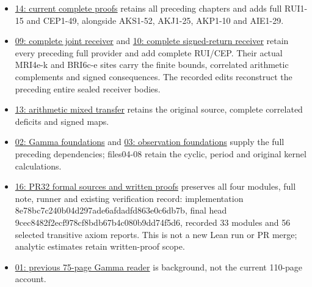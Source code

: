 \documentclass[
]{article}
\providecommand{\tightlist}{%
  \setlength{\itemsep}{0pt}\setlength{\parskip}{0pt}}
\begin{document}
\begin{itemize}
\tightlist
\item
  \href{https://github.com/KokunoYumeto/zeta-function-research-reader/blob/main/workbenches/splitzero-tandem/continuations/20260914-exterior-kernel-continuation/14_CURRENT_KERNEL_AND_MULTIPLICITY_PROOFS.tex}{14:
  current complete proofs} retains all preceding chapters and adds full
  RUI1-15 and CEP1-49, alongside AKS1-52, AKJ1-25, AKP1-10 and AIE1-29.
\item
  \href{https://github.com/KokunoYumeto/zeta-function-research-reader/blob/main/workbenches/splitzero-tandem/continuations/20260914-exterior-kernel-continuation/09_UPDATED_JOINT_NOTE.tex}{09:
  complete joint receiver} and
  \href{https://github.com/KokunoYumeto/zeta-function-research-reader/blob/main/workbenches/splitzero-tandem/continuations/20260914-exterior-kernel-continuation/10_UPDATED_SIGNED_RETURN.tex}{10:
  complete signed-return receiver} retain every preceding full provider
  and add complete RUI/CEP. Their actual MRI4e-k and BRI6c-e sites carry
  the finite bounds, correlated arithmetic complements and signed
  consequences. The recorded edits reconstruct the preceding entire
  sealed receiver bodies.
\item
  \href{https://github.com/KokunoYumeto/zeta-function-research-reader/blob/main/workbenches/splitzero-tandem/continuations/20260914-exterior-kernel-continuation/13_ARITHMETIC_MIXED_TRANSFER.tex}{13:
  arithmetic mixed transfer} retains the original source, complete
  correlated deficits and signed maps.
\item
  \href{https://github.com/KokunoYumeto/zeta-function-research-reader/blob/main/workbenches/splitzero-tandem/continuations/20260914-exterior-kernel-continuation/02_FULL_GAMMA_PROOFS.tex}{02:
  Gamma foundations} and
  \href{https://github.com/KokunoYumeto/zeta-function-research-reader/blob/main/workbenches/splitzero-tandem/continuations/20260914-exterior-kernel-continuation/03_FULL_OBSERVATION_PROOFS.tex}{03:
  observation foundations} supply the full preceding dependencies;
  files04-08 retain the cyclic, period and original kernel calculations.
\item
  \href{https://github.com/KokunoYumeto/zeta-function-research-reader/blob/main/workbenches/splitzero-tandem/continuations/20260914-exterior-kernel-continuation/16_PR32_FORMAL_SOURCE_AND_PROOFS.md}{16:
  PR32 formal sources and written proofs} preserves all four modules,
  full note, runner and existing verification record: implementation
  8e78bc7c240b04d297ade6afdadfd863e0c6db7b, final head
  9cec8482f2ecf978cf8bdb67b4c080b9dd74f5d6, recorded 33 modules and 56
  selected transitive axiom reports. This is not a new Lean run or PR
  merge; analytic estimates retain written-proof scope.
\item
  \href{https://github.com/KokunoYumeto/zeta-function-research-reader/blob/main/workbenches/splitzero-tandem/continuations/20260914-exterior-kernel-continuation/01_GAMMA_READER.pdf}{01:
  previous 75-page Gamma reader} is background, not the current 110-page
  account.
\end{itemize}
\end{document}
